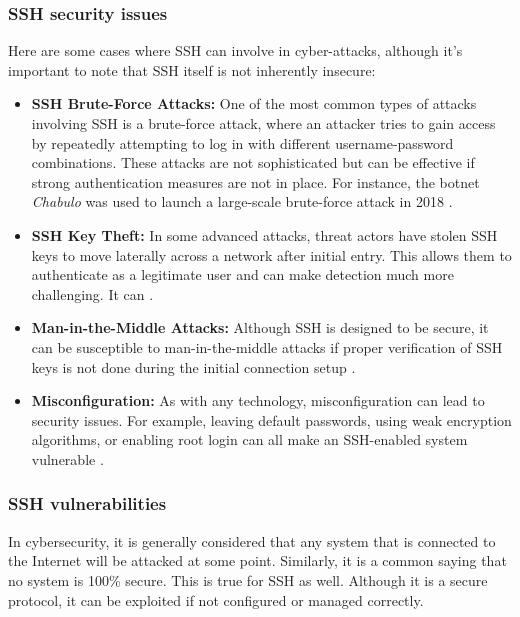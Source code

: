     \subsubsection{SSH security issues}
    Here are some cases where SSH can involve in cyber-attacks, although it's important to note that SSH itself is not inherently insecure:
    \begin{itemize}
        \item \textbf{SSH Brute-Force Attacks:} One of the most common types of attacks involving SSH is a brute-force attack, where an attacker tries to gain access by repeatedly attempting to log in with different username-password combinations. These attacks are not sophisticated but can be effective if strong authentication measures are not in place. For instance, the botnet \textit{Chabulo} was used to launch a large-scale brute-force attack  in 2018 \cite{SSHReport18}. 
        \item \textbf{SSH Key Theft:} In some advanced attacks, threat actors have stolen SSH keys to move laterally across a network after initial entry. This allows them to authenticate as a legitimate user and can make detection much more challenging. It can  \cite{SSHIdentityTheft05}.
        \item \textbf{Man-in-the-Middle Attacks:} Although SSH is designed to be secure, it can be susceptible to man-in-the-middle attacks if proper verification of SSH keys is not done during the initial connection setup \cite{OpenSSHUnderHood07}.
        \item \textbf{Misconfiguration:} As with any technology, misconfiguration can lead to security issues. For example, leaving default passwords, using weak encryption algorithms, or enabling root login can all make an SSH-enabled system vulnerable \cite{SSHBotnetInfect21}.
    \end{itemize}

    \subsubsection{SSH vulnerabilities}
    In cybersecurity, it is generally considered that any system that is connected to the Internet will be attacked at some point. Similarly, it is a common saying that no system is 100\% secure. This is true for SSH as well. Although it is a secure protocol, it can be exploited if not configured or managed correctly. 
    
